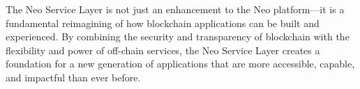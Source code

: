 \documentclass[11pt]{article}
\begin{document}
The Neo Service Layer is not just an enhancement to the Neo platform—it is a fundamental reimagining of how blockchain applications can be built and experienced. By combining the security and transparency of blockchain with the flexibility and power of off-chain services, the Neo Service Layer creates a foundation for a new generation of applications that are more accessible, capable, and impactful than ever before.
\end{document}

